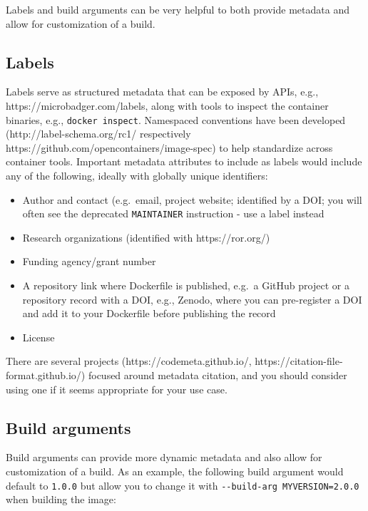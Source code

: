 \documentclass[10pt,letterpaper]{article}
\providecommand{\tightlist}{%
  \setlength{\itemsep}{0pt}\setlength{\parskip}{0pt}}
\begin{document}
Labels and build arguments can be very helpful to both provide metadata
and allow for customization of a build.

\hypertarget{labels}{%
\subsection{Labels}\label{labels}}

Labels serve as structured metadata that can be exposed by APIs, e.g.,
https://microbadger.com/labels, along with tools to inspect the
container binaries, e.g., \texttt{docker\ inspect}. Namespaced
conventions have been developed (http://label-schema.org/rc1/
respectively https://github.com/opencontainers/image-spec) to help
standardize across container tools. Important metadata attributes to
include as labels would include any of the following, ideally with
globally unique identifiers:

\begin{itemize}
\tightlist
\item
  Author and contact (e.g.~email, project website; identified by a DOI;
  you will often see the deprecated \texttt{MAINTAINER} instruction -
  use a label instead
\item
  Research organizations (identified with https://ror.org/)
\item
  Funding agency/grant number
\item
  A repository link where Dockerfile is published, e.g.~a GitHub project
  or a repository record with a DOI, e.g., Zenodo, where you can
  pre-register a DOI and add it to your Dockerfile before publishing the
  record
\item
  License
\end{itemize}

There are several projects (https://codemeta.github.io/,
https://citation-file-format.github.io/) focused around metadata
citation, and you should consider using one if it seems appropriate for
your use case.

\hypertarget{build-arguments}{%
\subsection{Build arguments}\label{build-arguments}}

Build arguments can provide more dynamic metadata and also allow for
customization of a build. As an example, the following build argument
would default to \texttt{1.0.0} but allow you to change it with
\texttt{-\/-build-arg\ MYVERSION=2.0.0} when building the image:
\end{document}

